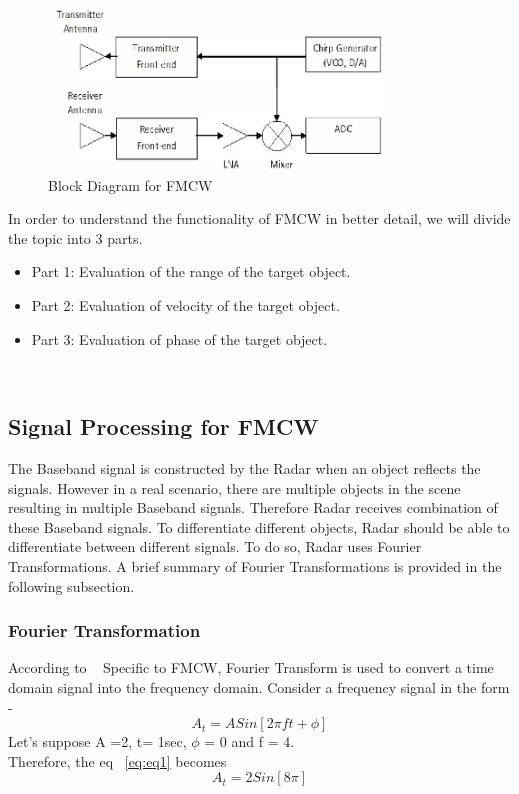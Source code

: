  \begin{figure}[ht]
  \begin{center}
    \includegraphics[width=0.80\textwidth]{Master's thesis/images/fmcw.png} 
    \caption{Block Diagram for FMCW}
    \label{fig:fmcw}
  \end{center}
\end{figure}   

In order to understand the functionality of FMCW in better detail, we will divide the topic into 3 parts.
\begin{itemize}
    \item Part 1: Evaluation of the range of the target object.
    \item Part 2: Evaluation of velocity of the target object.
    \item Part 3: Evaluation of phase of the target object.
\end{itemize}
\\

\subsection{Signal Processing for FMCW}
The Baseband signal is constructed by the Radar when an object reflects the signals. However in a real scenario, there are multiple objects in the scene resulting in multiple Baseband signals. Therefore Radar receives combination of these Baseband signals. To differentiate different objects, Radar should be able to differentiate between different signals. To do so, Radar uses Fourier Transformations. A brief summary of Fourier Transformations is provided in the following subsection.


\subsubsection{Fourier Transformation} \label{sec:FT}
According to ~\cite{FT}
Specific to FMCW, Fourier Transform is used to convert a time domain signal into the frequency domain. 
Consider a frequency signal in the form -  
\begin{equation}\label{eq:eq1}
A_{t}= ASin[2\pi ft + \phi]
\end{equation}
Let's suppose A =2, t= 1sec, \(\phi\) = 0 and f = 4.
\\
Therefore, the eq ~\ref{eq:eq1} becomes
\begin{equation}
A_{t}= 2Sin[8\pi]    
\end{equation}

